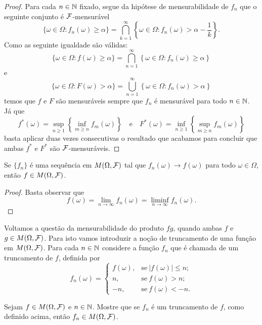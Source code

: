 \begin{proof}
Para cada $n\in\mathbb{N}$ fixado, segue da 
hipótese de mensurabilidade de $f_n$ que 
o seguinte conjunto é $\mathcal{F}$-mensurável
\[
\{\omega\in\Omega: f_n(\omega)\geq \alpha\}
=
\bigcap_{k=1}^{\infty}
\left\{
	\omega\in\Omega: f_n(\omega)>\alpha-\frac{1}{k} 
\right\}. 
\]
Como as seguinte igualdade são válidas:
	\[	
	\{\omega\in\Omega: f(\omega)\geq \alpha\} 
	=
	\bigcap_{n=1}^{\infty}
	\left\{
		\omega\in\Omega: f_n(\omega)\geq \alpha 
	\right\}
	\]
e
 	\[
 	\{\omega\in\Omega: F(\omega)> \alpha\} 
	=
	\bigcup_{n=1}^{\infty}
	\left\{
		\omega\in\Omega: f_n(\omega)> \alpha 
	\right\}
	\]
temos que $f$ e $F$ são mensuráveis sempre que $f_n$
é mensurável para todo $n\in\mathbb{N}$.
Já que 
	\[	
	f^*(\omega)
	=
	\sup_{n\geq 1}
	\left\{ \inf_{m\geq n} f_{m}(\omega) \right\}
	\quad
	\text{e}
	\quad
	F^*(\omega)
	=
	\inf_{n\geq 1}
	\left\{ \sup_{m\geq n} f_{m}(\omega) \right\}
	\]
basta aplicar duas vezes consecutivas o resultado que acabamos 
para concluir que ambas $f^*$ e $F^*$ são $\mathcal{F}$-mensuráveis.
\end{proof}




\begin{corolario}\label{cor-lim-mensuravel-eh-mensuravel}
Se $\{f_n\}$ é uma sequência em $M(\Omega,\mathcal{F})$ tal que
$f_n(\omega)\to f(\omega)$ para todo $\omega\in\Omega$,
então $f\in M(\Omega,\mathcal{F})$.
\end{corolario} 

\begin{proof}
	Basta observar que 
		\[
			f(\omega) 
			=\lim_{n\to\infty} f_n(\omega)
			=\liminf_{n\to\infty} f_n(\omega).
		\]
\end{proof}


Voltamos a questão da mensurabilidade do produto $fg$,
quando ambas $f$ e $g\in M(\Omega,\mathcal{F})$. Para isto 
vamos introduzir a noção de truncamento de uma função em 
$M(\Omega,\mathcal{F})$. Para cada $n\in\mathbb{N}$ considere a função 
$f_n$ que é chamada de um truncamento de $f$, definida por 
	\[
		f_n(\omega)
		=
		\begin{cases}
			f(\omega),&\text{se}\ |f(\omega)|\leq n;
			\\
			n,&\text{se}\ f(\omega)>n;
			\\
			-n,&\text{se}\ f(\omega)<-n.
		\end{cases}
	\]
\begin{exercicio}
	Sejam $f\in M(\Omega,\mathcal{F})$ e $n\in\mathbb{N}$. 
	Mostre que se $f_n$ é um truncamento de $f$, 
	como definido acima, então $f_n\in M(\Omega,\mathcal{F})$. 
\end{exercicio}

